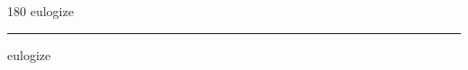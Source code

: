 
\begin{frame}
\begin{center}
\begin{turn}{180}
{\fontsize{2.5cm}{1em}\selectfont eulogize}
\end{turn}
\vspace{1em}\par  
\hrule
\vspace{1em}\par  
{\fontsize{2.5cm}{1em}\selectfont eulogize}
\end{center}
\end{frame}
